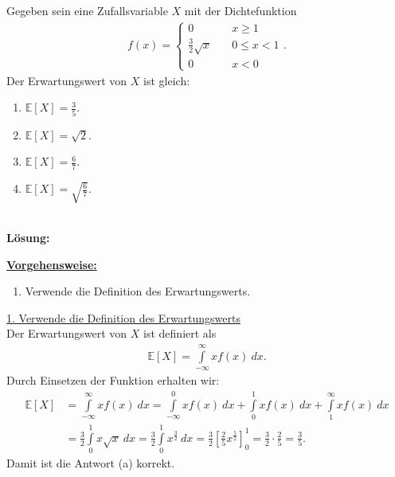\newpage
\subsection*{}
Gegeben sein eine Zufallsvariable $ X $ mit der Dichtefunktion
\begin{align*}
	f(x)
	=
	\begin{cases}
		0 \quad &x \geq 1\\
		\frac{3}{2} \sqrt{x} \quad &0 \leq x < 1\\
		0 \quad &x<0
	\end{cases}.
\end{align*}
Der Erwartungswert von $ X $ ist gleich:
\renewcommand{\labelenumi}{(\alph{enumi})}
\begin{enumerate}
	\item 
	$\mathbb{E}[X] = \frac{3}{5}$.
	\item
	$\mathbb{E}[X] = \sqrt{2}$.
	\item
	$\mathbb{E}[X] = \frac{6}{7}$.
	\item
	$\mathbb{E}[X] = \sqrt{\frac{6}{7}}$.
\end{enumerate}
\ \\
\textbf{Lösung:}
\begin{mdframed}
\underline{\textbf{Vorgehensweise:}}
\renewcommand{\labelenumi}{\theenumi.}
\begin{enumerate}
\item Verwende die Definition des Erwartungswerts.
\end{enumerate}
\end{mdframed}

\underline{1. Verwende die Definition des Erwartungswerts}\\
Der Erwartungswert von $ X $ ist definiert als
\begin{align*}
	\mathbb{E}[X] = \int \limits_{- \infty}^\infty x f(x) \ dx.
\end{align*}
Durch Einsetzen der Funktion erhalten wir:
\begin{align*}
	\mathbb{E}[X] 
	&= \int \limits_{- \infty}^\infty x f(x) \ dx
	= \int \limits_{- \infty}^0 x f(x) \ dx 
	+ \int \limits_{0}^1 x f(x) \ dx 
	+ \int \limits_{1}^\infty x f(x) \ dx \\
	&= \frac{3}{2} \int \limits_{0}^1 x \sqrt{x} \ dx
	= \frac{3}{2} \int \limits_{0}^1 x^{\frac{3}{2}} \ dx
	= \frac{3}{2} \left[\frac{2}{5} x^{\frac{5}{2}}\right]_0^1
	= \frac{3}{2} \cdot \frac{2}{5} = \frac{3}{5}.
\end{align*}
Damit ist die Antwort (a) korrekt.

